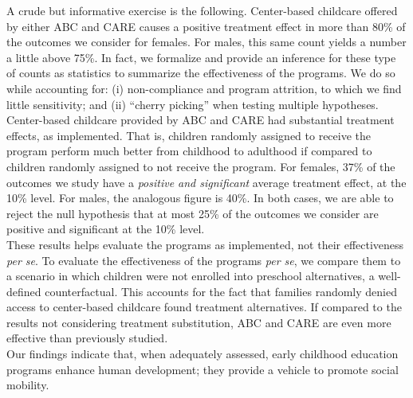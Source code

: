 \noindent A crude but informative exercise is the following. Center-based childcare offered by either ABC and CARE causes a positive treatment effect in more than 80\% of the outcomes we consider for females. For males, this same count yields a number a little above 75\%. In fact, we formalize and provide an inference for these type of counts as statistics to summarize the effectiveness of the programs. We do so while accounting for: (i) non-compliance and program attrition, to which we find little sensitivity; and (ii) ``cherry picking'' when testing multiple hypotheses.\\

\noindent Center-based childcare provided by ABC and CARE had substantial treatment effects, as implemented. That is, children randomly assigned to receive the program perform much better from childhood to adulthood if compared to children randomly assigned to not receive the program. For females, 37\% of the outcomes we study have a \textit{positive and significant} average treatment effect, at the 10\% level. For males, the analogous figure is 40\%. In both cases, we are able to reject the null hypothesis that at most 25\% of the outcomes we consider are positive and significant at the 10\% level.\\

\noindent These results helps evaluate the programs as implemented, not their effectiveness \textit{per se}. To evaluate the effectiveness of the programs \textit{per se}, we compare them to a scenario in which children were not enrolled into preschool alternatives,  a well-defined counterfactual. This accounts for the fact that families randomly denied access to center-based childcare found treatment alternatives. If compared to the results not considering treatment substitution, ABC and CARE are even more effective than previously studied.\\

\noindent Our findings indicate that, when adequately assessed, early childhood education programs enhance human development; they provide a vehicle to promote social mobility.

\singlespace



 